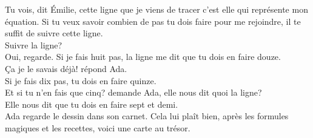 \guillemotleft Tu vois, dit Émilie, cette ligne que je viens de tracer c’est elle qui représente mon équation. Si tu veux savoir combien de pas tu dois faire pour me rejoindre, il te suffit de suivre cette ligne.\\
\mdash Suivre la ligne?\\
\mdash Oui, regarde. Si je fais huit pas, la ligne me dit que tu dois en faire douze.\\
\mdash Ça je le savais déjà! répond Ada.\\
\mdash Si je fais dix pas, tu dois en faire quinze.\\
\mdash Et si tu n’en fais que cinq? demande Ada, elle nous dit quoi la ligne?\\
\mdash Elle nous dit que tu dois en faire sept et demi.\guillemotright\\
Ada regarde le dessin dans son carnet. Cela lui plaît bien, après les formules magiques et les recettes, voici une carte au trésor.
